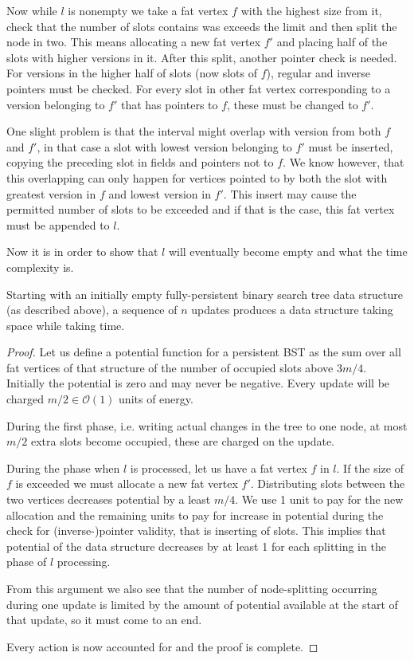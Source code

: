 Now while $l$ is nonempty we take a fat vertex $f$ with the highest size from it, check that the number of slots contains was exceeds the limit and then split the node in two. This means allocating a new fat vertex $f'$ and placing half of the slots with higher versions in it. After this split, another pointer check is needed. For versions in the higher half of slots (now slots of $f$), regular and inverse pointers must be checked. For every slot in other fat vertex corresponding to a version belonging to $f'$  that has pointers to $f$, these must be changed to $f'$. 

One slight problem is that the interval might overlap with version from both $f$ and $f'$, in that case a slot with lowest version belonging to $f'$ must be inserted, copying the preceding slot in fields and pointers not to $f$. We know however, that this overlapping can only happen for vertices pointed to by both the slot with greatest version in $f$ and lowest version in $f'$. This insert may cause the permitted number of slots to be exceeded and if that is the case, this fat vertex must be appended to $l$.

Now it is in order to show that $l$ will eventually become empty and what the time complexity is.

\begin{prop}
Starting with an initially empty fully-persistent binary search tree data structure (as described above), a sequence of $n$ updates produces a data structure taking  space while taking  time.
\end{prop}

\begin{proof}
Let us define a potential function for a persistent BST as the sum over all fat vertices of that structure of the number of occupied slots above $3m/4$. Initially the potential is zero and may never be negative. Every update will be charged $m/2 \in \mathcal{O}(1)$ units of energy.

During the first phase, i.e. writing actual changes in the tree to one node, at most $m/2$ extra slots become occupied, these are charged on the update.

During the phase when $l$ is processed, let us have a fat vertex $f$ in $l$. If the size of $f$ is exceeded we must allocate a new fat vertex $f'$. Distributing slots between the two vertices decreases potential by a least $m/4$. We use 1 unit to pay for the new allocation and the remaining units to pay for increase in potential during the check for (inverse-)pointer validity, that is inserting of slots. This implies that potential of the data structure decreases by at least 1 for each splitting in the phase of $l$ processing.

From this argument we also see that the number of node-splitting occurring during one update is limited by the amount of potential available at the start of that update, so it must come to an end.

Every action is now accounted for and the proof is complete.
\end{proof}

